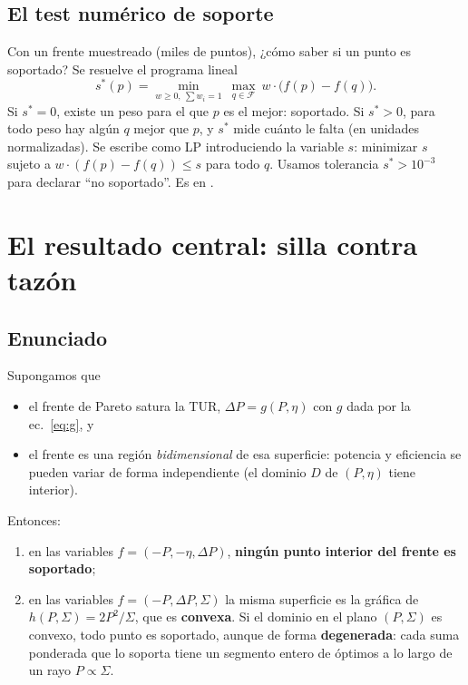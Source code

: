 \subsection{El test numérico de soporte}

Con un frente muestreado (miles de puntos), ¿cómo saber si un punto es soportado? Se resuelve el
programa lineal
\begin{equation}
s^*(p) = \min_{w\ge0,\ \sum w_i = 1}\ \max_{q\in\mathcal{F}}\ w\cdot\bigl(f(p) - f(q)\bigr).
\label{eq:gap}
\end{equation}
Si $s^* = 0$, existe un peso para el que $p$ es el mejor: soportado. Si $s^* > 0$, para todo peso
hay algún $q$ mejor que $p$, y $s^*$ mide cuánto le falta (en unidades normalizadas). Se escribe como
LP introduciendo la variable $s$: minimizar $s$ sujeto a $w\cdot(f(p)-f(q)) \le s$ para todo $q$.
Usamos tolerancia $s^* > 10^{-3}$ para declarar ``no soportado''. Es  en
.

\section{El resultado central: silla contra tazón}
\label{sec:prop}

\subsection{Enunciado}

\begin{proposicion}
\label{prop}
Supongamos que
\begin{itemize}
\item[\textbf{(H1)}] el frente de Pareto satura la TUR, $\Delta P = g(P,\eta)$ con $g$ dada por la
  ec.~\eqref{eq:g}, y
\item[\textbf{(H2)}] el frente es una región \emph{bidimensional} de esa superficie: potencia y
  eficiencia se pueden variar de forma independiente (el dominio $D$ de $(P,\eta)$ tiene interior).
\end{itemize}
Entonces:
\begin{enumerate}
\item[(i)] en las variables $f = (-P,-\eta,\Delta P)$, \textbf{ningún punto interior del frente es
  soportado};
\item[(ii)] en las variables $f = (-P,\Delta P,\Sigma)$ la misma superficie es la gráfica de
  $h(P,\Sigma) = 2P^2/\Sigma$, que es \textbf{convexa}. Si el dominio en el plano $(P,\Sigma)$ es
  convexo, todo punto es soportado, aunque de forma \textbf{degenerada}: cada suma ponderada que lo
  soporta tiene un segmento entero de óptimos a lo largo de un rayo $P\propto\Sigma$.
\end{enumerate}
\end{proposicion}

